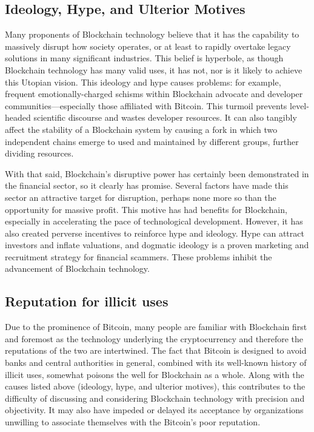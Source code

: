 \subsection{Ideology, Hype, and Ulterior Motives}
Many proponents of Blockchain technology believe that it has the capability to massively disrupt how society operates, or at least to rapidly overtake legacy solutions in many significant industries. This belief is hyperbole, as though Blockchain technology has many valid uses, it has not, nor is it likely to achieve this Utopian vision. This ideology and hype causes problems: for example, frequent emotionally-charged schisms within Blockchain advocate and developer communities---especially those affiliated with Bitcoin. This turmoil prevents level-headed scientific discourse and wastes developer resources. It can also tangibly affect the stability of a Blockchain system by causing a fork in which two independent chains emerge to used and maintained by different groups, further dividing resources.

With that said, Blockchain's disruptive power has certainly been demonstrated in the financial sector, so it clearly has promise. Several factors have made this sector an attractive target for disruption, perhaps none more so than the opportunity for massive profit. This motive has had benefits for Blockchain, especially in accelerating the pace of technological development. However, it has also created perverse incentives to reinforce hype and ideology. Hype can attract investors and inflate valuations, and dogmatic ideology is a proven marketing and recruitment strategy for financial scammers. These problems inhibit the advancement of Blockchain technology.

\subsection{Reputation for illicit uses}
Due to the prominence of Bitcoin, many people are familiar with Blockchain first and foremost as the technology underlying the cryptocurrency and therefore the reputations of the two are intertwined. The fact that Bitcoin is designed to avoid banks and central authorities in general, combined with its well-known history of illicit uses, somewhat poisons the well for Blockchain as a whole. Along with the causes listed above (ideology, hype, and ulterior motives), this contributes to the difficulty of discussing and considering Blockchain technology with precision and objectivity. It may also have impeded or delayed its acceptance by organizations unwilling to associate themselves with the Bitcoin's poor reputation.